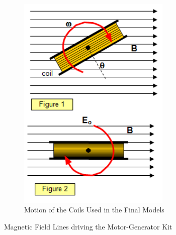 \begin{figure}[ht]
            \begin{subfigure}[b]{0.5\linewidth}
                \centering
                \includegraphics[width=0.8\textwidth]{figures/moving_coil.png} %
                \caption{Motion of the Coils Used in the Final Models}
            \end{subfigure}
            \caption{Magnetic Field Lines driving the Motor-Generator Kit}
        \end{figure} \label{fig:moving_coil}

    \clearpage